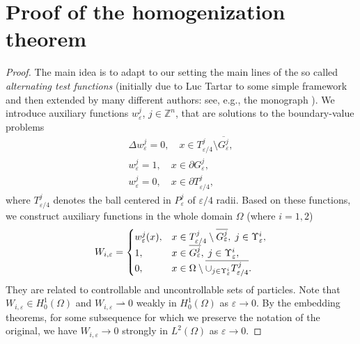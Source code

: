 \documentclass[10pt,a4paper]{amsart}
\numberwithin{equation}{section}
\begin{document}
\section{Proof of the homogenization theorem}

\begin{proof}
The main idea is to adapt to our setting the main lines of the so called
\textit{alternating test functions} (initially due to Luc Tartar to some
simple framework and then extended by many different authors: see, e.g., the
monograph \cite{DiGoShBook}). 
We introduce auxiliary functions $w_{\varepsilon }^{j}$, $j\in \mathbb{Z}^n$, 
that are solutions to the boundary-value problems
\begin{equation}
\begin{gathered}
\Delta {w}_{\varepsilon }^{j}=0, \quad x\in T_{{\varepsilon }/4}^{j}\setminus
\overline{G_{\varepsilon }^{j}}, \\
w_{\varepsilon }^{j}=1, \quad x\in \partial {G_{\varepsilon }^{j}}, \\
w_{\varepsilon }^{j}=0, \quad x\in \partial {T_{{\varepsilon }/4}^{j}},%
\end{gathered}   \label{def: auxiliary func w}
\end{equation}%
where $T_{{\varepsilon }/4}^{j}$ denotes the ball centered in 
$P_{\varepsilon }^{j}$ of ${{\varepsilon }/4}$ radii. Based on these
functions, we construct auxiliary functions in the whole domain $\Omega $
(where $i=1,2$)
\begin{equation}
W_{i,\varepsilon }=\begin{cases}
w_{\varepsilon }^{j}(x), & x\in T_{\varepsilon /4}^{j}\setminus \overline{%
G_{\varepsilon }^{j}},\; j\in \Upsilon _{\varepsilon }^{i}, \\
1, & x\in \overline{G_{\varepsilon }^{j}},\; j\in \Upsilon _{\varepsilon
}^{i}, \\
0, & x\in \Omega \setminus \overline{\cup _{j\in \Upsilon
_{\varepsilon }^{i}}{T_{{\varepsilon }/4}^{j}}}.%
\end{cases}   \label{def: W aux func}
\end{equation}%
They are related to controllable and uncontrollable sets of particles.
Note that $W_{i,\varepsilon }\in H_0^{1}(\Omega )$ and 
$W_{i,\varepsilon }\rightharpoonup 0$ weakly in $H_0^{1}(\Omega )$ as 
$\varepsilon \to 0$. By the embedding theorems, for some subsequence for
which we preserve the notation of the original, we have 
$W_{i,\varepsilon }\to 0$ strongly in $L^2(\Omega )$ as $\varepsilon \to 0$.


\end{proof}
\end{document}
